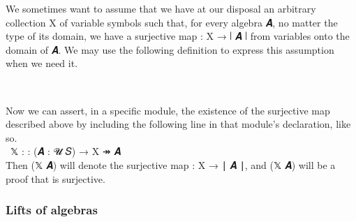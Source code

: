 We sometimes want to assume that we have at our disposal an arbitrary collection \ab X of variable symbols such that, for every algebra \ab 𝑨, no matter the type of its domain, we have a surjective map  \as : \ab X \as → \af ∣ \ab 𝑨 \af ∣ from variables onto the domain of \ab 𝑨. We may use the following definition to express this assumption when we need it.
\ccpad
\begin{code}%
\>[0]\AgdaSpace{}%
\AgdaSymbol{:}\AgdaSpace{}%
\AgdaSymbol{\{}\AgdaSpace{}%
\AgdaSymbol{:}\AgdaSpace{}%
\AgdaSpace{}%
\AgdaSpace{}%
\AgdaSymbol{\}\{}\AgdaSpace{}%
\AgdaSpace{}%
\AgdaSymbol{:}\AgdaSpace{}%
\AgdaSymbol{\}}\AgdaSpace{}%
\AgdaSpace{}%
\AgdaSpace{}%
\AgdaSpace{}%
\AgdaSpace{}%
\AgdaSpace{}%
\AgdaSpace{}%
\AgdaSpace{}%
\AgdaSpace{}%
\AgdaSpace{}%
\AgdaSpace{}%
\AgdaSpace{}%
\<%
\\
\>[0]\AgdaSpace{}%
\AgdaSpace{}%
\AgdaSpace{}%
\AgdaSymbol{=}\AgdaSpace{}%
\AgdaSpace{}%
\AgdaSpace{}%
\AgdaSpace{}%
\AgdaSymbol{(}\AgdaSpace{}%
\AgdaSpace{}%
\AgdaSpace{}%
\AgdaSpace{}%
\AgdaSymbol{)}\AgdaSpace{}%
\AgdaFunction{,}\AgdaSpace{}%
\AgdaSpace{}%
\<%
\end{code}
\ccpad
Now we can assert, in a specific module, the existence of the surjective map described above by including the following line in that module's declaration, like so.\\[4pt]

 \AgdaUnderscore \ \as{\{}\ab 𝕏 \as : \as{\{} \as : \as{\}\{}\as{\}}(\ab 𝑨 \as :  \ab 𝓤 \ab 𝑆) \as → \ab X \af ↠ \ab 𝑨\as{\}} \\[4pt]

Then (\af 𝕏 \ab 𝑨) will denote the surjective map  \as : \ab X \as → \af ∣ \ab 𝑨 \af ∣, and (\af 𝕏 \ab 𝑨) will be a proof that  is surjective.

\subsubsection{Lifts of algebras}\label{lifts-of-algebras}

